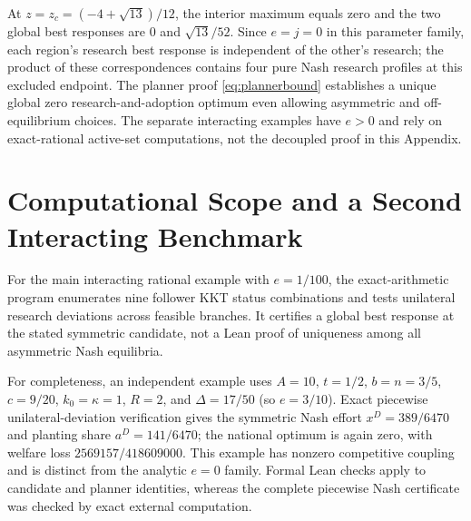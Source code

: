 \documentclass[USenglish]{article}
\begin{document}
At $z=z_c=(-4+\sqrt{13})/12$, the interior maximum equals zero and the two global best responses are $0$ and $\sqrt{13}/52$. Since $e=j=0$ in this parameter family, each region's research best response is independent of the other's research; the product of these correspondences contains four pure Nash research profiles at this excluded endpoint. The planner proof \eqref{eq:plannerbound} establishes a unique global zero research-and-adoption optimum even allowing asymmetric and off-equilibrium choices. The separate interacting examples have $e>0$ and rely on exact-rational active-set computations, not the decoupled proof in this Appendix.


\section{Computational Scope and a Second Interacting Benchmark}
For the main interacting rational example with $e=1/100$, the exact-arithmetic program enumerates nine follower KKT status combinations and tests unilateral research deviations across feasible branches. It certifies a global best response at the stated symmetric candidate, not a Lean proof of uniqueness among all asymmetric Nash equilibria.

For completeness, an independent example uses $A=10$, $t=1/2$, $b=n=3/5$, $c=9/20$, $k_0=\kappa=1$, $R=2$, and $\Delta=17/50$ (so $e=3/10$). Exact piecewise unilateral-deviation verification gives the symmetric Nash effort $x^D=389/6470$ and planting share $a^D=141/6470$; the national optimum is again zero, with welfare loss $2569157/418609000$. This example has nonzero competitive coupling and is distinct from the analytic $e=0$ family. Formal Lean checks apply to candidate and planner identities, whereas the complete piecewise Nash certificate was checked by exact external computation.

\begingroup
\small


\endgroup
\end{document}
